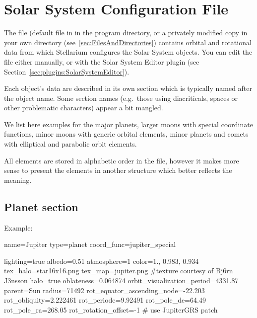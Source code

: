 

\section{Solar System Configuration File}
\label{sec:ssystem.ini}

The file  (default file in  in the
program directory, or a privately modified copy in your own
 directory (see~\ref{sec:FilesAndDirectories}) contains
orbital and rotational data from which Stellarium configures the Solar
System objects. You can edit the file either manually, or with the
Solar System Editor plugin (see
Section~\ref{sec:plugins:SolarSystemEditor}).




Each object's data are described in its own section which is typically
named after the object name. Some section names (e.g.\ those using
diacriticals, spaces or other problematic characters) appear a bit mangled.

We list here examples for the major planets, larger moons with special
coordinate functions, minor moons with generic orbital elements, minor
planets and comets with elliptical and parabolic orbit elements.

All elements are stored in alphabetic order in the file, however it
makes more sense to present the elements in another structure which
better reflects the meaning.

\subsection{Planet section}
\label{sec:ssystem.ini:Planet}

Example:
\begin{configfile}
[jupiter]
name=Jupiter
type=planet  
coord_func=jupiter_special

lighting=true
albedo=0.51
atmosphere=1
color=1., 0.983, 0.934
tex_halo=star16x16.png
tex_map=jupiter.png #texture courtesy of Bj\xf6rn J\xf3nsson
halo=true
oblateness=0.064874
orbit_visualization_period=4331.87
parent=Sun
radius=71492
rot_equator_ascending_node=-22.203
rot_obliquity=2.222461
rot_periode=9.92491
rot_pole_de=64.49
rot_pole_ra=268.05
rot_rotation_offset=-1 # use JupiterGRS patch
\end{configfile}


